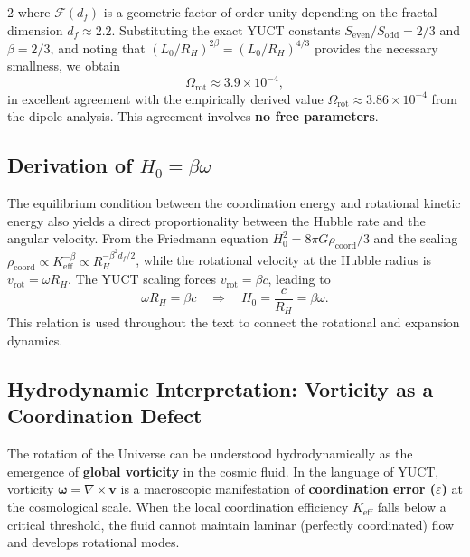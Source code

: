 \documentclass[12pt,a4paper]{article}
\begin{document}
\begin{multicols}{2}
		where \(\mathcal{F}(d_f)\) is a geometric factor of order unity depending on the fractal dimension \(d_f \approx 2.2\). Substituting the exact YUCT constants \(S_{\mathrm{even}}/S_{\mathrm{odd}} = 2/3\) and \(\beta = 2/3\), and noting that \((L_0/R_H)^{2\beta} = (L_0/R_H)^{4/3}\) provides the necessary smallness, we obtain
		\begin{equation}
			\boxed{\Omega_{\mathrm{rot}} \approx 3.9 \times 10^{-4}},
		\end{equation}
		in excellent agreement with the empirically derived value \(\Omega_{\mathrm{rot}} \approx 3.86 \times 10^{-4}\) from the dipole analysis. This agreement involves \textbf{no free parameters}.
		
		\subsection{Derivation of \(H_0 = \beta \omega\)}
		
		The equilibrium condition between the coordination energy and rotational kinetic energy also yields a direct proportionality between the Hubble rate and the angular velocity. From the Friedmann equation \(H_0^2 = 8\pi G \rho_{\mathrm{coord}} / 3\) and the scaling \(\rho_{\mathrm{coord}} \propto K_{\mathrm{eff}}^{-\beta} \propto R_H^{-\beta^2 d_f /2}\), while the rotational velocity at the Hubble radius is \(v_{\mathrm{rot}} = \omega R_H\). The YUCT scaling forces \(v_{\mathrm{rot}} = \beta c\), leading to
		\begin{equation}
			\omega R_H = \beta c \quad \Rightarrow \quad H_0 = \frac{c}{R_H} = \beta \omega.
			\label{eq:H0-beta-omega}
		\end{equation}
		This relation is used throughout the text to connect the rotational and expansion dynamics.
		
		\subsection{Hydrodynamic Interpretation: Vorticity as a Coordination Defect}
		
		The rotation of the Universe can be understood hydrodynamically as the emergence of \textbf{global vorticity} in the cosmic fluid. In the language of YUCT, vorticity \(\boldsymbol{\omega} = \nabla \times \mathbf{v}\) is a macroscopic manifestation of \textbf{coordination error (\(\varepsilon\))} at the cosmological scale. When the local coordination efficiency \(K_{\mathrm{eff}}\) falls below a critical threshold, the fluid cannot maintain laminar (perfectly coordinated) flow and develops rotational modes.
		

\end{multicols}
\end{document}
